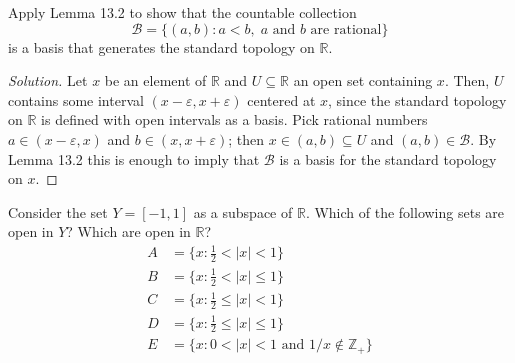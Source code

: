 \documentclass[11pt]{scrartcl}
\providecommand{\eps}{\varepsilon}
\providecommand{\RR}{\mathbb R}
\providecommand{\ZZ}{\mathbb Z}
\newenvironment{soln}{\begin{proof}[Solution]}{\end{proof}}
\begin{document}
\begin{problem*}
    [Munkres 13.8a]
    Apply Lemma 13.2 to show that the countable collection
    \begin{equation*}
	\mathcal B = \{(a,b) : a<b,\; \text{$a$ and $b$ are rational}\}
    \end{equation*}
    is a basis that generates the standard topology on $\RR$.
\end{problem*}

\begin{soln}
    Let $x$ be an element of $\RR$ and $U\subseteq\RR$
    an open set containing $x$. Then, $U$ contains some interval
    $(x-\eps,x+\eps)$ centered at $x$, since the standard topology on $\RR$
    is defined with open intervals as a basis.
    Pick rational numbers $a\in (x-\eps,x)$ and $b\in(x,x+\eps)$;
    then $x\in(a,b)\subseteq U$ and $(a,b)\in\mathcal B$.
    By Lemma 13.2 this is enough to imply that $\mathcal B$
    is a basis for the standard topology on $x$.
\end{soln}

\begin{problem*}
    [Munkres 16.3]
    Consider the set $Y = [-1,1]$ as a subspace of $\RR$.
    Which of the following sets are open in $Y$?
    Which are open in $\RR$?
    \begin{align*}
	A &= \{x : \tfrac12 < |x| < 1\} \\
	B &= \{x : \tfrac12 < |x| \le 1\} \\
	C &= \{x : \tfrac12 \le |x| < 1\} \\
	D &= \{x : \tfrac12 \le |x| \le 1\} \\
	E &= \{x : 0 < |x| < 1\text{ and }1/x\notin\ZZ_+\}
    \end{align*}
\end{problem*}
\end{document}
